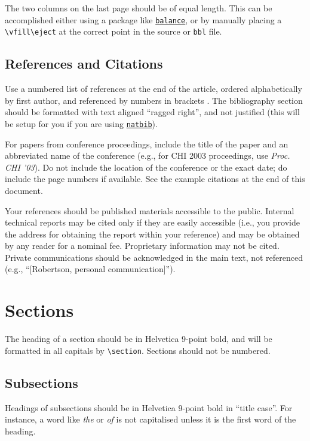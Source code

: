 \documentclass[preprint]{../latex/sigchi-modern}
\begin{document}
The two columns on the last page should be of equal length. This can be 
accomplished either using a package like 
\texttt{\href{http://ctan.org/pkg/balance}{balance}}, or by manually placing
a \texttt{\textbackslash vfill\textbackslash eject} at the correct point in
the source or \texttt{bbl} file.

\subsection{References and Citations}
Use a numbered list of references at the end of the article, ordered
alphabetically by first author, and referenced by numbers in brackets
\cite{Card1983,Card1990,Card1991,Gillick1996}.
The bibliography section should be formatted with text aligned ``ragged right'',
and not justified (this will be setup for you if you are using
\texttt{\href{http://ctan.org/pkg/natbib}{natbib}}).

For papers from conference proceedings, include the title of the paper and an
abbreviated name of the conference (e.g., for CHI 2003 proceedings, use
\textit{Proc. CHI '03}). Do not include the location of the conference or the
exact date; do include the page numbers if available. See the example
citations at the end of this document.

Your references should be published materials accessible to the public. Internal
technical reports may be cited only if they are easily accessible (i.e., you
provide the address for obtaining the report within your reference) and may be
obtained by any reader for a nominal fee. Proprietary information may not be
cited. Private communications should be acknowledged in the main text, not
referenced (e.g., ``[Robertson, personal communication]'').

\section{Sections}
The heading of a section should be in Helvetica 9-point bold, and will be
formatted in all capitals by \texttt{\textbackslash section}. Sections should
not be numbered.

\subsection{Subsections}
Headings of subsections should be in Helvetica 9-point bold in ``title case''.
For instance, a word like \emph{the} or \emph{of} is not capitalised unless it
is the first word of the heading.
\end{document}
